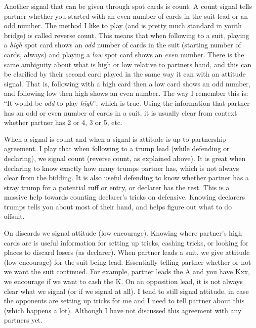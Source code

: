 \documentclass[a4paper]{report}
\theoremstyle{question}
\theoremstyle{theorem}
\theoremstyle{definition}
\newcommand{\<}{\left\langle}%
\renewcommand{\>}{\right\rangle}%
\begin{document}
Another signal that can be given through spot cards is count. A count signal tells partner whether you started with an even number of cards in the suit lead or an odd number. The method I like to play (and is pretty much standard in youth bridge) is called reverse count. This means that when following to a suit, playing a \textit{high} spot card shows an \textit{odd} number of cards in the suit (starting number of cards, always) and playing a \textit{low} spot card shows an \textit{even} number. There is the same ambiguity about what is high or low relative to partners hand, and this can be clarified by their second card played in the same way it can with an attitude signal. That is, following with a high card then a low card shows an odd number, and following low then high shows an even number. The way I remember this is: ``It would be \textit{odd} to play \textit{high}'', which is true. Using the information that partner has an odd or even number of cards in a suit, it is usually clear from context whether partner has 2 or 4, 3 or 5, etc.


When a signal is count and when a signal is attitude is up to partnership agreement. I play that when following to a trump lead (while defending or declaring), we signal count (reverse count, as explained above). It is great when declaring to know exactly how many trumps partner has, which is not always clear from the bidding. It is also useful defending to know whether partner has a stray trump for a potential ruff or entry, or declarer has the rest. This is a massive help towards counting declarer's tricks on defensive. Knowing declarers trumps tells you about most of their hand, and helps figure out what to do offsuit.

On discards we signal attitude (low encourage). Knowing where partner's high cards are is useful information for setting up tricks, cashing tricks, or looking for places to discard losers (as declarer). When partner leads a suit, we give attitude (low encourage) for the suit being lead. Essentially telling partner whether or not we want the suit continued. For example, partner leads the A and you have Kxx, we encourage if we want to cash the K. On an opposition lead, it is not always clear what we signal (or if we signal at all). I tend to still signal attitude, in case the opponents are setting up tricks for me and I need to tell partner about this (which happens a lot). Although I have not discussed this agreement with any partners yet.
\end{document}
